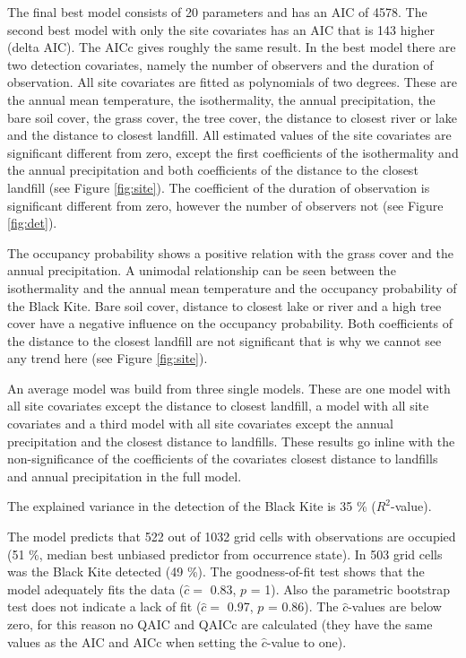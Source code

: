\begin{multicols}{2}
The final best model consists of 20 parameters and has an AIC of 4578. The second best model with only the site covariates has an AIC that is 143 higher (delta AIC). The AICc gives roughly the same result. In the best model there are two detection covariates, namely the number of observers and the duration of observation. All site covariates are fitted as polynomials of two degrees. These are the annual mean temperature, the isothermality, the annual precipitation, the bare soil cover, the grass cover, the tree cover, the distance to closest river or lake and the distance to closest landfill. All estimated values of the site covariates are significant different from zero, except the first coefficients of the isothermality and the annual precipitation and both coefficients of the distance to the closest landfill (see Figure \ref{fig:site}). The coefficient of the duration of observation is significant different from zero, however the number of observers not (see Figure \ref{fig:det}).

The occupancy probability shows a positive relation with the grass cover and the annual precipitation. A unimodal relationship can be seen between the isothermality and the annual mean temperature and the occupancy probability of the Black Kite. Bare soil cover, distance to closest lake or river and a high tree cover have a negative influence on the occupancy probability. Both coefficients of the distance to the closest landfill are not significant that is why we cannot see any trend here (see Figure \ref{fig:site}). 

An average model was build from three single models. These are one model with all site covariates except the distance to closest landfill, a model with all site covariates and a third model with all site covariates except the annual precipitation and the closest distance to landfills. These results go inline with the non-significance of the coefficients of the covariates closest distance to landfills and annual precipitation in the full model.

The explained variance in the detection of the Black Kite is 35 \% ($R^2$-value).

The model predicts that 522 out of 1032 grid cells with observations are occupied (51 \%, median best unbiased predictor from occurrence state). In 503 grid cells was the Black Kite detected (49 \%). The \textcite{MacKenzie2004} goodness-of-fit test shows that the model adequately fits the data ($\hat{c} = $ 0.83, $p$ = 1). Also the parametric bootstrap test does not indicate a lack of fit ($\hat{c} = $ 0.97, $p$ = 0.86). The $\hat{c}$-values are below zero, for this reason no QAIC and QAICc are calculated (they have the same values as the AIC and AICc when setting the $\hat{c}$-value to one). 


\end{multicols}
